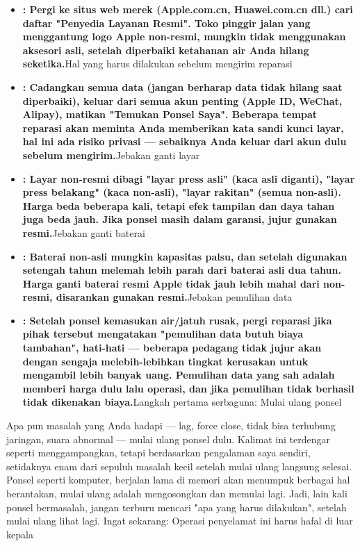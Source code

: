 \begin{itemize}
  \item \textbf{: Pergi ke situs web merek (Apple.com.cn, Huawei.com.cn dll.) cari daftar "Penyedia Layanan Resmi". Toko pinggir jalan yang menggantung logo Apple non-resmi, mungkin tidak menggunakan aksesori asli, setelah diperbaiki ketahanan air Anda hilang seketika.}Hal yang harus dilakukan sebelum mengirim reparasi
  \item \textbf{: Cadangkan semua data (jangan berharap data tidak hilang saat diperbaiki), keluar dari semua akun penting (Apple ID, WeChat, Alipay), matikan "Temukan Ponsel Saya". Beberapa tempat reparasi akan meminta Anda memberikan kata sandi kunci layar, hal ini ada risiko privasi — sebaiknya Anda keluar dari akun dulu sebelum mengirim.}Jebakan ganti layar
  \item \textbf{: Layar non-resmi dibagi "layar press asli" (kaca asli diganti), "layar press belakang" (kaca non-asli), "layar rakitan" (semua non-asli). Harga beda beberapa kali, tetapi efek tampilan dan daya tahan juga beda jauh. Jika ponsel masih dalam garansi, jujur gunakan resmi.}Jebakan ganti baterai
  \item \textbf{: Baterai non-asli mungkin kapasitas palsu, dan setelah digunakan setengah tahun melemah lebih parah dari baterai asli dua tahun. Harga ganti baterai resmi Apple tidak jauh lebih mahal dari non-resmi, disarankan gunakan resmi.}Jebakan pemulihan data
  \item \textbf{: Setelah ponsel kemasukan air/jatuh rusak, pergi reparasi jika pihak tersebut mengatakan "pemulihan data butuh biaya tambahan", hati-hati — beberapa pedagang tidak jujur akan dengan sengaja melebih-lebihkan tingkat kerusakan untuk mengambil lebih banyak uang. Pemulihan data yang sah adalah memberi harga dulu lalu operasi, dan jika pemulihan tidak berhasil tidak dikenakan biaya.}Langkah pertama serbaguna: Mulai ulang ponsel
\end{itemize}

\begin{tcbwarn}{Apa pun masalah yang Anda hadapi — lag, force close, tidak bisa terhubung jaringan, suara abnormal — mulai ulang ponsel dulu. Kalimat ini terdengar seperti menggampangkan, tetapi berdasarkan pengalaman saya sendiri, setidaknya enam dari sepuluh masalah kecil setelah mulai ulang langsung selesai. Ponsel seperti komputer, berjalan lama di memori akan menumpuk berbagai hal berantakan, mulai ulang adalah mengosongkan dan memulai lagi. Jadi, lain kali ponsel bermasalah, jangan terburu mencari "apa yang harus dilakukan", setelah mulai ulang lihat lagi.}
Ingat sekarang: Operasi penyelamat ini harus hafal di luar kepala

\end{tcbwarn}

